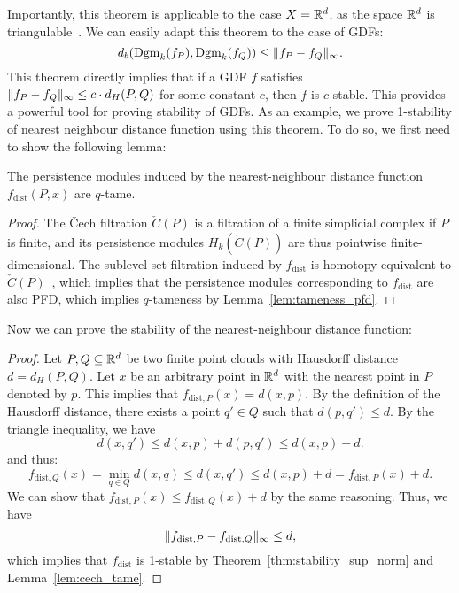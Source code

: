 Importantly, this theorem is applicable to the case $X = \mathbb{R}^d$, as the space
$\mathbb{R}^d$ is triangulable~\cite{moise2013geometric}. We can easily adapt this
theorem to the case of GDFs:
\begin{equation}
    d_b(\operatorname{Dgm}_k(f_P), \operatorname{Dgm}_k(f_Q)) \leq \lVert f_P - f_Q\rVert_{\infty}.
\end{equation}
This theorem directly implies that if a GDF $f$ satisfies
$\lVert f_P - f_Q\rVert_\infty \leq c \cdot d_H(P, Q)$ for some constant $c$, then
$f$ is $c$-stable. This provides a powerful tool for proving stability of GDFs.
As an example, we prove 1-stability of nearest neighbour distance function using
this theorem. To do so, we first need to show the following lemma:
\begin{lemma}
    \label{lem:cech_tame}
    The persistence modules induced by the nearest-neighbour distance function
    $f_{\mathrm{dist}}(P, x)$ are $q$-tame.
\end{lemma}
\begin{proof}
    The \v{C}ech filtration $\check{C}(P)$ is a filtration of a finite
    simplicial complex if $P$ is finite, and its persistence modules
    $H_k(\check{C}(P))$ are thus pointwise finite-dimensional. The sublevel set
    filtration induced by $f_{\mathrm{dist}}$ is homotopy equivalent to
    $\check{C}(P)$~\cite{schnider2024introduction}, which implies that the
    persistence modules corresponding to $f_{\mathrm{dist}}$ are also PFD, which
    implies $q$-tameness by Lemma~\ref{lem:tameness_pfd}.
\end{proof}
Now we can prove the stability of the nearest-neighbour distance function:
\begin{proof}
    Let $P, Q \subseteq \mathbb{R}^d$ be two finite point clouds with Hausdorff distance
    $d = d_H(P, Q)$. Let $x$ be an arbitrary point in $\mathbb{R}^d$ with the nearest
    point in $P$ denoted by $p$. This implies that $f_{\mathrm{dist}, P}(x) =
    d(x, p)$.  By the definition of the Hausdorff distance, there exists a point
    $q' \in Q$ such that $d(p, q') \leq d$. By the triangle inequality, we have
    \begin{equation}
        d(x, q') \leq d(x, p) + d(p, q') \leq d(x, p) + d.
    \end{equation}
    and thus:
    \begin{equation}
        f_{\mathrm{dist}, Q}(x) = \min_{q \in Q} d(x, q) \leq d(x, q') \leq d(x, p) + d = f_{\mathrm{dist}, P}(x) + d.
    \end{equation}
    We can show that $f_{\mathrm{dist}, P}(x) \leq f_{\mathrm{dist}, Q}(x) + d$
    by the same reasoning. Thus, we have
    \begin{equation}
        \lVert f_{\mathrm{dist}, P} - f_{\mathrm{dist}, Q}\rVert_\infty \leq d,
    \end{equation}
    which implies that $f_{\mathrm{dist}}$ is 1-stable by
    Theorem~\ref{thm:stability_sup_norm} and Lemma~\ref{lem:cech_tame}.
\end{proof}

